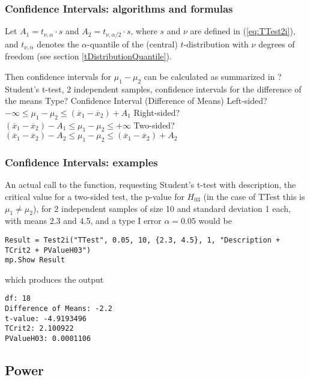 \subsubsection{Confidence Intervals: algorithms and formulas}
\label{2iSampleTTest_CI}

Let $A_1=t_{\nu,\alpha} \cdot s$ and $A_2=t_{\nu,\alpha/2} \cdot s$, where $s$ and $\nu$ are defined in (\ref{eq:TTest2i}), and $t_{\nu,\alpha}$ denotes the $\alpha$-quantile of the (central) $t$-distribution with $\nu$ degrees of freedom (see section \ref{tDistributionQuantile}). 


\mpTableTwoColsThreeRows
{Then confidence intervals for $\mu_1 - \mu_2$ can be calculated as summarized in ? Student's t-test, 2 independent samples, confidence intervals for the difference of the means}
{Type? Confidence Interval (Difference of Means)}
{Left-sided? $-\infty \leq \mu_1 - \mu_2 \leq (\overline{x}_1-\overline{x}_2) + A_1$}
{Right-sided? $(\overline{x}_1-\overline{x}_2) - A_1 \leq \mu_1 - \mu_2 \leq +\infty$}
{Two-sided? $(\overline{x}_1-\overline{x}_2) - A_2 \leq \mu_1 - \mu_2 \leq (\overline{x}_1-\overline{x}_2) + A_2$}



\subsubsection{Confidence Intervals: examples}
An actual call to the function, requesting Student's t-test with description, the critical value for a two-sided test, the p-value for $H_{03}$ (in the case of \textsf{TTest} this is $\mu_1 \neq \mu_2$), for 2 independent samples of size 10 and standard deviation 1 each, with means 2.3 and 4.5, and a type I error $\alpha=0.05$ would be

\begin{lstlisting}
Result = Test2i("TTest", 0.05, 10, {2.3, 4.5}, 1, "Description + TCrit2 + PValueH03")
mp.Show Result
\end{lstlisting}
which produces the output

\begin{verbatim}
df: 18
Difference of Means: -2.2
t-value: -4.9193496
TCrit2: 2.100922
PValueH03: 0.0001106
\end{verbatim}





\newpage
\subsection{Power}


